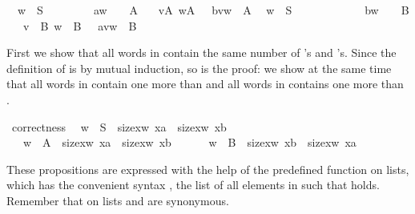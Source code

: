 \begin{isabellebody}
\isanewline
\ \ {\isachardoublequoteopen}w\ {\isasymin}\ S\ \ \ \ \ \ \ \ {\isasymLongrightarrow}\ a{\isacharhash}w\ \ \ {\isasymin}\ A{\isachardoublequoteclose}\isanewline
\ \ {\isachardoublequoteopen}{\isasymlbrakk}\ v{\isasymin}A{\isacharsemicolon}\ w{\isasymin}A\ {\isasymrbrakk}\ {\isasymLongrightarrow}\ b{\isacharhash}v{\isacharat}w\ {\isasymin}\ A{\isachardoublequoteclose}\isanewline
\isanewline
\ \ {\isachardoublequoteopen}w\ {\isasymin}\ S\ \ \ \ \ \ \ \ \ \ \ \ {\isasymLongrightarrow}\ b{\isacharhash}w\ \ \ {\isasymin}\ B{\isachardoublequoteclose}\isanewline
\ \ {\isachardoublequoteopen}{\isasymlbrakk}\ v\ {\isasymin}\ B{\isacharsemicolon}\ w\ {\isasymin}\ B\ {\isasymrbrakk}\ {\isasymLongrightarrow}\ a{\isacharhash}v{\isacharat}w\ {\isasymin}\ B{\isachardoublequoteclose}%
\begin{isamarkuptext}%
\noindent
First we show that all words in  contain the same number of 's and 's. Since the definition of  is by mutual
induction, so is the proof: we show at the same time that all words in
 contain one more  than  and all words in  contains one more  than .%
\end{isamarkuptext}%
\isamarkuptrue%
\isamarkupfalse%
\ correctness{\isacharcolon}\isanewline
\ \ {\isachardoublequoteopen}{\isacharparenleft}w\ {\isasymin}\ S\ {\isasymlongrightarrow}\ size{\isacharbrackleft}x{\isasymleftarrow}w{\isachardot}\ x{\isacharequal}a{\isacharbrackright}\ {\isacharequal}\ size{\isacharbrackleft}x{\isasymleftarrow}w{\isachardot}\ x{\isacharequal}b{\isacharbrackright}{\isacharparenright}\ \ \ \ \ {\isasymand}\isanewline
\ \ \ {\isacharparenleft}w\ {\isasymin}\ A\ {\isasymlongrightarrow}\ size{\isacharbrackleft}x{\isasymleftarrow}w{\isachardot}\ x{\isacharequal}a{\isacharbrackright}\ {\isacharequal}\ size{\isacharbrackleft}x{\isasymleftarrow}w{\isachardot}\ x{\isacharequal}b{\isacharbrackright}\ {\isacharplus}\ {}{\isacharparenright}\ {\isasymand}\isanewline
\ \ \ {\isacharparenleft}w\ {\isasymin}\ B\ {\isasymlongrightarrow}\ size{\isacharbrackleft}x{\isasymleftarrow}w{\isachardot}\ x{\isacharequal}b{\isacharbrackright}\ {\isacharequal}\ size{\isacharbrackleft}x{\isasymleftarrow}w{\isachardot}\ x{\isacharequal}a{\isacharbrackright}\ {\isacharplus}\ {}{\isacharparenright}{\isachardoublequoteclose}%
\isadelimproof
%
\endisadelimproof
%
\isatagproof
%
\begin{isamarkuptxt}%
\noindent
These propositions are expressed with the help of the predefined  function on lists, which has the convenient syntax , the list of all elements  in  such that 
holds. Remember that on lists  and  are synonymous.


\end{isamarkuptxt}
\end{isabellebody}
